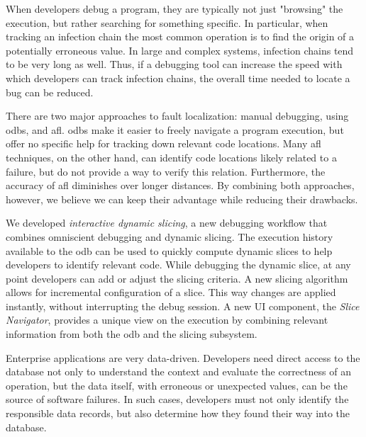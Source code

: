 
When developers debug a program, they are typically not just "browsing" the execution, but rather searching for something specific.
In particular, when tracking an infection chain the most common operation is to find the origin of a potentially erroneous value.
In large and complex systems, infection chains tend to be very long as well.
Thus, if a debugging tool can increase the speed with which developers can track infection chains, the overall time needed to locate a bug can be reduced.

There are two major approaches to fault localization: manual debugging, \eg using \acfp{odb}, and \acf{afl}.
\Acp{odb} make it easier to freely navigate a program execution, but offer no specific help for tracking down relevant code locations.
Many \ac{afl} techniques, on the other hand, can identify code locations likely related to a failure, but do not provide a way to verify this relation.
Furthermore, the accuracy of \ac{afl} diminishes over longer distances.
By combining both approaches, however, we believe we can keep their advantage while reducing their drawbacks.

We developed \emph{interactive dynamic slicing}, a new debugging workflow that combines omniscient debugging and dynamic slicing. 
The execution history available to the \ac{odb} can be used to quickly compute dynamic slices to help developers to identify relevant code.
While debugging the dynamic slice, at any point developers can add or adjust the slicing criteria.
A new slicing algorithm allows for incremental configuration of a slice. 
This way changes are applied instantly, without interrupting the debug session. 
A new UI component, the \emph{Slice Navigator}, provides a unique view on the execution by combining relevant information from both the \ac{odb} and the slicing subsystem.


Enterprise applications are very data-driven.
Developers need direct access to the database not only to understand the context and evaluate the correctness of an operation, but the data itself, with erroneous or unexpected values, can be the source of software failures.
In such cases, developers must not only identify the responsible data records, but also determine how they found their way into the database.

